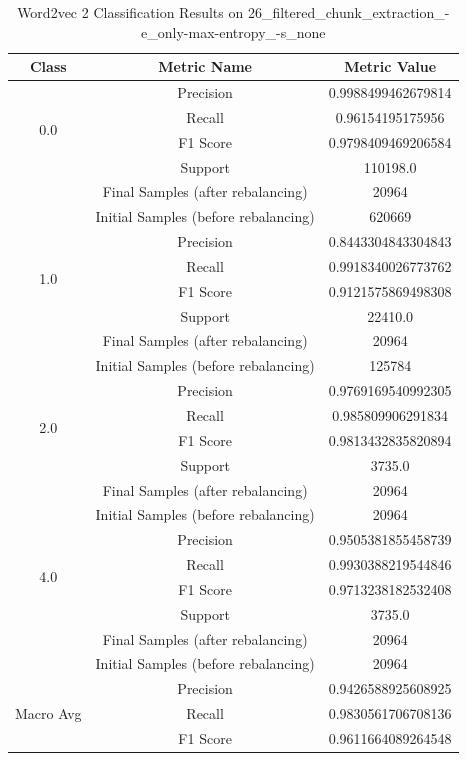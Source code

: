 \begin{longtable}{|c|c|c|}
\caption{Word2vec 2 Classification Results on 26\_filtered\_chunk\_extraction\_-e\_only-max-entropy\_-s\_none} \label{tab:26_filtered_chunk_extraction_-e_only-max-entropy_-s_none_word2vec_2_classifiers_results} \\
\hline
Class & Metric Name & Metric Value \\
\hline
\multirow{4}{*}{0.0} & Precision & 0.9988499462679814 \\
 & Recall & 0.96154195175956 \\
 & F1 Score & 0.9798409469206584 \\
 & Support & 110198.0 \\
 & Final Samples (after rebalancing) & 20964 \\
 & Initial Samples (before rebalancing) & 620669 \\
\hline
\multirow{4}{*}{1.0} & Precision & 0.8443304843304843 \\
 & Recall & 0.9918340026773762 \\
 & F1 Score & 0.9121575869498308 \\
 & Support & 22410.0 \\
 & Final Samples (after rebalancing) & 20964 \\
 & Initial Samples (before rebalancing) & 125784 \\
\hline
\multirow{4}{*}{2.0} & Precision & 0.9769169540992305 \\
 & Recall & 0.985809906291834 \\
 & F1 Score & 0.9813432835820894 \\
 & Support & 3735.0 \\
 & Final Samples (after rebalancing) & 20964 \\
 & Initial Samples (before rebalancing) & 20964 \\
\hline
\multirow{4}{*}{4.0} & Precision & 0.9505381855458739 \\
 & Recall & 0.9930388219544846 \\
 & F1 Score & 0.9713238182532408 \\
 & Support & 3735.0 \\
 & Final Samples (after rebalancing) & 20964 \\
 & Initial Samples (before rebalancing) & 20964 \\
\hline
\multirow{4}{*}{Macro Avg} & Precision & 0.9426588925608925 \\
 & Recall & 0.9830561706708136 \\
 & F1 Score & 0.9611664089264548 \\

\end{longtable}
